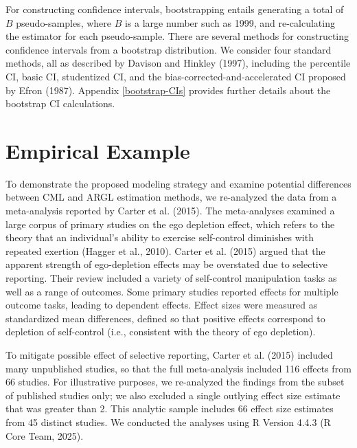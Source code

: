 \documentclass[
  man, donotrepeattitle,floatsintext]{apa7}
\begin{document}
For constructing confidence intervals, bootstrapping entails generating a total of \(B\) pseudo-samples, where \(B\) is a large number such as 1999, and re-calculating the estimator for each pseudo-sample.
There are several methods for constructing confidence intervals from a bootstrap distribution.
We consider four standard methods, all as described by Davison and Hinkley (1997), including the percentile CI, basic CI, studentized CI, and the bias-corrected-and-accelerated CI proposed by Efron (1987).
Appendix \ref{bootstrap-CIs} provides further details about the bootstrap CI calculations.

\section{Empirical Example}\label{empirical-example}

To demonstrate the proposed modeling strategy and examine potential differences between CML and ARGL estimation methods, we re-analyzed the data from a meta-analysis reported by Carter et al. (2015).
The meta-analyses examined a large corpus of primary studies on the ego depletion effect, which refers to the theory that an individual's ability to exercise self-control diminishes with repeated exertion (Hagger et al., 2010).
Carter et al. (2015) argued that the apparent strength of ego-depletion effects may be overstated due to selective reporting.
Their review included a variety of self-control manipulation tasks as well as a range of outcomes.
Some primary studies reported effects for multiple outcome tasks, leading to dependent effects.
Effect sizes were measured as standardized mean differences, defined so that positive effects correspond to depletion of self-control (i.e., consistent with the theory of ego depletion).

To mitigate possible effect of selective reporting, Carter et al. (2015) included many unpublished studies, so that the full meta-analysis included 116 effects from 66 studies.
For illustrative purposes, we re-analyzed the findings from the subset of published studies only; we also excluded a single outlying effect size estimate that was greater than 2. This analytic sample includes 66 effect size estimates from 45 distinct studies.
We conducted the analyses using R Version 4.4.3 (R Core Team, 2025).
\end{document}
